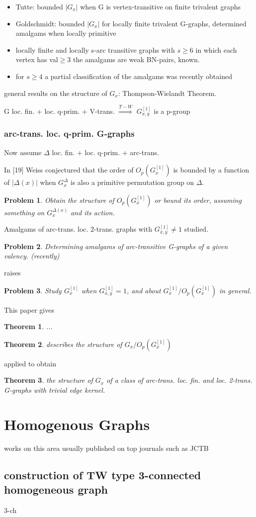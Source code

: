 \documentclass[a4paper,11pt,openany]{book}
\newtheorem{theorem}{Theorem}[section]
\newtheorem{problem}{Problem}[section]
\begin{document}
\begin{itemize}
	\item Tutte: bounded $|G_x|$ when G is vertex-transitive on finite trivalent graphs
	\item Goldschmidt: bounded $|G_x|$ for locally finite trivalent G-graphs, determined amalgams when locally primitive
	\item locally finite and locally s-arc transitive graphs with $s\geq 6$ in which each vertex has val$\geq 3$ the amalgams are weak BN-pairs, known.
	\item for $s\geq 4$ a partial classification of the amalgams was recently obtained 
\end{itemize}


general results on the structure of $G_x$: Thompson-Wielandt Theorem.

\centerline{
G loc. fin. + loc. q-prim. + V-trans. $\mathop{\Longrightarrow}\limits^{T-W}$ $G_{x,y}^{[1]}$ is a p-group}

\subsection{arc-trans. loc. q-prim. G-graphs}

Now assume $\Delta$ loc. fin. + loc. q-prim. + arc-trans.


In [19] Weiss conjectured that the order of $O_p(G_x^{[1]})$ is bounded by a function of $|\Delta(x)|$ when $G_x^\Delta$ is also a primitive permutation group on $\Delta$.

\begin{problem}
	Obtain the structure of $O_p(G_x^{[1]})$ or bound its order, assuming something on $G_x^{\Delta(x)}$ and its action.
\end{problem}

Amalgams of arc-trans. loc. 2-trans. graphs with $G_{x,y}^{[1]}\neq 1$ studied.

\begin{problem}
	Determining amalgams of arc-transitive G-graphs of a given valency. (recently)
\end{problem}

raises
\begin{problem}
	Study $G_x^{[1]}$ when $G_{x,y}^{[1]}= 1$, and about $G_x^{[1]}/O_p(G_x^{[1]})$ in general.
\end{problem}

This paper gives
\begin{theorem}
	...
\end{theorem}
\begin{theorem}
	describes the structure of $G_x/O_p(G_x^{[1]})$
\end{theorem}
applied to obtain 
\begin{theorem}
	the structure of $G_x$ of a class of arc-trans. loc. fin. and loc. 2-trans. G-graphs with trivial edge kernel.
\end{theorem}


\chapter{Homogenous Graphs}
works on this area usually published on top journals such as JCTB
\section{construction of TW type 3-connected homogeneous graph}
3-ch
\end{document}
